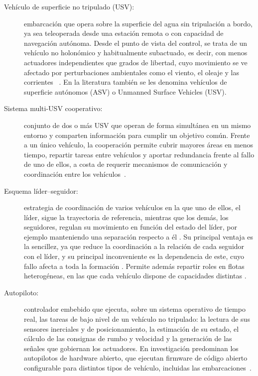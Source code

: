 \begin{description}
 
  \item[Vehículo de superficie no tripulado (USV):] embarcación que opera sobre la
    superficie del agua sin tripulación a bordo, ya sea teleoperada desde una estación
    remota o con capacidad de navegación autónoma. Desde el punto de
    vista del control, se trata de un vehículo no holonómico y habitualmente
    subactuado, es decir, con menos actuadores independientes que grados de libertad,
    cuyo movimiento se ve afectado por perturbaciones ambientales como el viento, el
    oleaje y las corrientes~\cite{kumar2025} \cite{jin2025}. En la literatura también se les
    denomina vehículos de superficie autónomos (ASV) o Unmanned Surface Vehicles (USV).
 
  \item[Sistema multi-USV cooperativo:] conjunto de dos o más USV que operan de forma
    simultánea en un mismo entorno y comparten información para cumplir un objetivo
    común. Frente a un único vehículo, la cooperación permite cubrir mayores áreas en
    menos tiempo, repartir tareas entre vehículos y aportar redundancia frente al fallo
    de uno de ellos, a costa de requerir mecanismos de comunicación y coordinación entre
    los vehículos~\cite{dunbabin2012}.

  \item[Esquema líder--seguidor:] estrategia de coordinación de varios vehículos en la que uno 
  de ellos, el líder, sigue la trayectoria de referencia, mientras que los demás, los seguidores, 
  regulan su movimiento en función del estado del líder, por ejemplo manteniendo una separación 
  respecto a él \cite{desai2001}. Su principal ventaja es la sencillez, ya que reduce la coordinación
   a la relación de cada seguidor con el líder, y su principal inconveniente es la dependencia de este, 
   cuyo fallo afecta a toda la formación \cite{desai2001}. Permite además repartir roles en flotas 
   heterogéneas, en las que cada vehículo dispone de capacidades distintas \cite{manjanna2018}.
 
  \item[Autopiloto:] controlador embebido que ejecuta, sobre un sistema operativo de
    tiempo real, las tareas de bajo nivel de un vehículo no tripulado: la lectura de sus
    sensores inerciales y de posicionamiento, la estimación de su estado, el cálculo de
    las consignas de rumbo y velocidad y la generación de las señales que gobiernan los
    actuadores. En investigación predominan los autopilotos de hardware abierto, que
    ejecutan firmware de código abierto configurable para distintos tipos de vehículo,
    incluidas las embarcaciones~\cite{aliane2026}.
  

\end{description}
